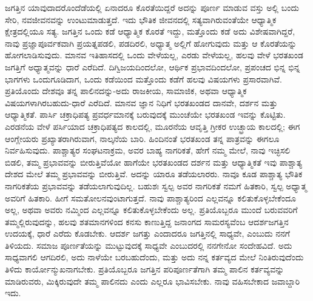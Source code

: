 ಜಗತ್ತಿನ ಯಾವುದಾದರೊಂದೆಡೆಯಲ್ಲಿ ಏನಾದರೂ ಕೊರತೆಯಿದ್ದರೆ ಅದನ್ನು ಪೂರ್ಣ ಮಾಡುವ ವಸ್ತು ಅಲ್ಲಿ ಬಂದು ಸೇರಿ, ನವಜೀವನವನ್ನು ಉಂಟುಮಾಡುತ್ತದೆ. ಇದು ಭೌತಿಕ ಜೀವನದಲ್ಲಿ ಸತ್ಯವಾಗಿರುವಂತೆಯೇ ಆಧ್ಯಾತ್ಮಿಕ ಕ್ಷೇತ್ರದಲ್ಲಿಯೂ ಸತ್ಯ. ಜಗತ್ತಿನ ಒಂದು ಕಡೆ ಆಧ್ಯಾತ್ಮಿಕ ಕೊರತೆ ಇದ್ದು, ಮತ್ತೊಂದು ಕಡೆ ಅದು ವಿಶೇಷವಾಗಿದ್ದರೆ, ನಾವು ಪ್ರಜ್ಞಾಪೂರ್ವಕವಾಗಿ ಪ್ರಯತ್ನಪಡಲಿ, ಪಡದಿರಲಿ, ಅಧ್ಯಾತ್ಮ ಅಲ್ಲಿಗೆ ಹೋಗುವುದು ಮತ್ತು ಆ ಕೊರತೆಯನ್ನು ಹೋಗಲಾಡಿಸುವುದು. ಮಾನವ ಇತಿಹಾಸದಲ್ಲಿ ಒಂದು ವೇಳೆಯಲ್ಲ, ಎರಡು ವೇಳೆಯಲ್ಲ, ಹಲವು ವೇಳೆ ಭರತಖಂಡ ಜಗತ್ತಿಗೆ ಅಧ್ಯಾತ್ಮವನ್ನು ಧಾರೆ ಎರೆದಿದೆ. ದಿಗ್ವಿಜಯದಿಂದಲೋ, ಆರ್ಥಿಕ ಪ್ರಭಾವದಿಂದಲೋ, ಪ್ರಪಂಚದ ಭಿನ್ನ ಭಿನ್ನ ಭಾಗಗಳು ಒಂದುಗೂಡಿದಾಗ, ಒಂದು ಕಡೆಯಿಂದ ಮತ್ತೊಂದು ಕಡೆಗೆ ಹಲವು ವಿಷಯಗಳು ಪ್ರಸಾರವಾಗಿವೆ. ಪ್ರತಿಯೊಂದು ದೇಶವೂ ತನ್ನ ಪಾಲಿನದನ್ನು-ಅದು ರಾಜಕೀಯ, ಸಾಮಾಜಿಕ, ಅಥವಾ ಆಧ್ಯಾತ್ಮಿಕ ವಿಷಯಗಳಾಗಿರಬಹುದು-ಧಾರೆ ಎರೆದಿದೆ. ಮಾನವ ಜ್ಞಾನ ನಿಧಿಗೆ ಭರತಖಂಡದ ದಾನವೇ, ದರ್ಶನ ಮತ್ತು ಆಧ್ಯಾತ್ಮಿಕತೆ. ಪಾರ್ಸಿ ಚಕ್ರಾಧಿಪತ್ಯ ಪ್ರವರ್ಧಮಾನಕ್ಕೆ ಬರುವುದಕ್ಕೆ ಮುಂಚೆಯೇ ಭರತಖಂಡ ಇವನ್ನು ಕೊಟ್ಟಿತು. ಎರಡನೆಯ ವೇಳೆ ಪರ್ಸಿಯಾದ ಚಕ್ರಾಧಿಪತ್ಯದ ಕಾಲದಲ್ಲಿ, ಮೂರನೆಯ ಆವೃತ್ತಿ ಗ್ರೀಕರ ಉಚ್ಛ್ರಾಯ ಕಾಲದಲ್ಲಿ; ಈಗ ಆಂಗ್ಲೇಯರು ಪ್ರಖ್ಯಾತರಾಗಿರುವಾಗ, ನಾಲ್ಕನೆಯ ಬಾರಿ. ಹಿಂದಿನಂತೆ ಭರತಖಂಡ ತನ್ನ ಪಾತ್ರವನ್ನು ಈಗಲೂ ನಿರ್ವಹಿಸುವುದು. ಪಾಶ್ಚಾತ್ಯರ ಸಂಘಟನಾಕ್ರಮ, ಅವರ ಬಾಹ್ಯ ನಾಗರಿಕತೆ, ಹೇಗೆ ನಮ್ಮ ಮೇಲೆ, ನಾವು ಇಚ್ಛಿಸಲಿ ಬಿಡಲಿ, ತಮ್ಮ ಪ್ರಭಾವವನ್ನು ಬೀರುತ್ತಿವೆಯೋ ಹಾಗೆಯೇ ಭರತಖಂಡದ ದರ್ಶನ ಮತ್ತು ಆಧ್ಯಾತ್ಮಿಕತೆ ಇವು ಪಾಶ್ಚಾತ್ಯ ದೇಶದ ಮೇಲೆ ತಮ್ಮ ಪ್ರಭಾವವನ್ನು ಬೀರುತ್ತಿವೆ. ಅದನ್ನು ಯಾರೂ ತಡೆಯಲಾರರು. ನಾವೂ ಕೂಡ ಪಾಶ್ಚಾತ್ಯ ಭೌತಿಕ ನಾಗರಿಕತೆಯ ಪ್ರಭಾವವನ್ನು ತಡೆಯಲಾಗುವುದಿಲ್ಲ. ಬಹುಶಃ ಸ್ವಲ್ಪ ಅವರ ನಾಗರಿಕತೆ ನಮಗೆ ಹಿತಕಾರಿ, ಸ್ವಲ್ಪ ಅಧ್ಯಾತ್ಮ ಅವರಿಗೆ ಹಿತಕಾರಿ. ಹೀಗೆ ಸಮತೋಲನವುಂಟಾಗುತ್ತದೆ. ನಾವು ಪಾಶ್ಚಾತ್ಯರಿಂದ ಎಲ್ಲವನ್ನೂ ಕಲಿತುಕೊಳ್ಳಬೇಕೆಂದೂ ಅಲ್ಲ, ಅಥವಾ ಅವರು ನಮ್ಮಿಂದ ಎಲ್ಲವನ್ನೂ ಕಲಿತುಕೊಳ್ಳಬೇಕೆಂದು ಅಲ್ಲ. ಪ್ರತಿಯೊಬ್ಬರೂ ಮುಂದೆ ಬರುವವರಿಗೆ ತಮ್ಮಲ್ಲಿರುವುದನ್ನು, ಹಲವು ಶತಮಾನಗಳಿಂದ ಕನಸು ಕಾಣುತ್ತಿದ್ದ ಜನಾಂಗದ ಸಾಮರಸ್ಯವೆಂಬ ಆದರ್ಶಜಗತ್ತಿನ ಉದಯಕ್ಕೆ, ಧಾರೆ ಎರೆದು ಕೊಡಬೇಕು. ಆದರ್ಶ ಜಗತ್ತು ಎಂದಾದರೂ ಜಗತ್ತಿನಲ್ಲಿ ಸಾಧ್ಯವೇ, ಎಂಬುದು ನನಗೆ ತಿಳಿಯದು. ಸಮಾಜ ಪೂರ್ಣತೆಯನ್ನು ಮುಟ್ಟುವುದಕ್ಕೆ ಸಾಧ್ಯವೇ ಎಂಬುದರಲ್ಲಿ ನನಗೇನೋ ಸಂದೇಹವಿದೆ. ಅದು ಸಾಧ್ಯವಾಗಲಿ ಆಗದಿರಲಿ, ಅದು ನಾಳೆಯೇ ಬರಬಹುದೆಂದು, ಮತ್ತು ಅದು ನನ್ನ ಕರ್ತವ್ಯದ ಮೇಲೆ ನಿಂತಿರುವುದೆಂದು ತಿಳಿದು ಕಾರ್ಯೋನ್ಮುಖನಾಗಬೇಕು. ಪ್ರತಿಯೊಬ್ಬರೂ ಜಗತ್ತಿನ ಪರಿಪೂರ್ಣತೆಗಾಗಿ ತಮ್ಮ ಪಾಲಿನ ಕರ್ತವ್ಯವನ್ನು ಮಾಡಿರುವರು, ಮಿಕ್ಕಿರುವುದೇ ತಮ್ಮ ಪಾಲಿನದು ಎಂದು ಎಲ್ಲರೂ ಭಾವಿಸಬೇಕು. ನಾವು ವಹಿಸಬೇಕಾದ ಜವಾಬ್ದಾರಿ ಇದು.


